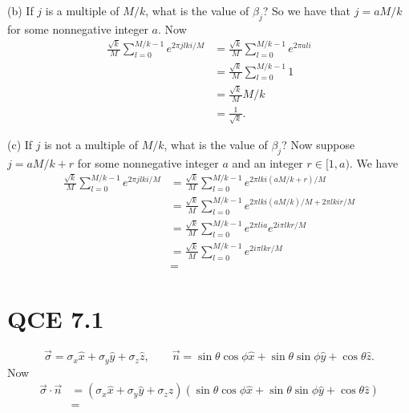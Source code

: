 \documentclass[10pt]{article}
\begin{document}
(b) If $j$ is a multiple of $M/k$, what is the value of $\beta_j$? So we have that $j = aM / k$ for some nonnegative integer $a$. Now
\begin{align*}
\frac{\sqrt{k}}{M} \sum_{l = 0}^{M/k - 1} e^{2\pi j l k i/M} &= \frac{\sqrt{k}}{M} \sum_{l = 0}^{M/k - 1} e^{2\pi a l  i} \\
&= \frac{\sqrt{k}}{M} \sum_{l = 0}^{M/k - 1} 1 \\
&= \frac{\sqrt{k}}{M} M/k \\
&= \frac{1}{\sqrt{k}}.
\end{align*}

(c) If $j$ is not a multiple of $M/k$, what is the value of $\beta_j$? Now suppose $j = aM/k + r$ for some nonnegative integer $a$ and an integer $r \in [1, a)$. We have
\begin{align*}
\frac{\sqrt{k}}{M} \sum_{l = 0}^{M/k - 1} e^{2\pi j l k i/M} &= \frac{\sqrt{k}}{M} \sum_{l = 0}^{M/k - 1} e^{2\pi l k i ( aM / k + r ) / M} \\
&= \frac{\sqrt{k}}{M} \sum_{l = 0}^{M/k - 1} e^{2\pi l k i ( aM / k ) / M + 2\pi l k i r / M }  \\
&= \frac{\sqrt{k}}{M} \sum_{l = 0}^{M/k - 1} e^{2 \pi l i a} e^{2 i \pi l k r / M} \\
&= \frac{\sqrt{k}}{M} \sum_{l = 0}^{M/k - 1} e^{2 i \pi l k r / M} \\
&= 
\end{align*}

\section*{QCE 7.1}
\[
\vec{\sigma} = \sigma_x \hat{x} + \sigma_y \hat{y} + \sigma_z \hat{z}, \qquad
\vec{n} = \sin \theta \cos \phi \hat{x} + \sin \theta \sin \phi \hat{y} + \cos \theta \hat{z}.
\]
Now
\begin{align*}
\vec{\sigma} \cdot \vec{n} &= (\sigma_x \hat{x} + \sigma_y \hat{y} + \sigma_z \hat{z})(\sin \theta \cos \phi \hat{x} + \sin \theta \sin \phi \hat{y} + \cos \theta \hat{z}) \\
            							   &= 
\end{align*}
\end{document}

